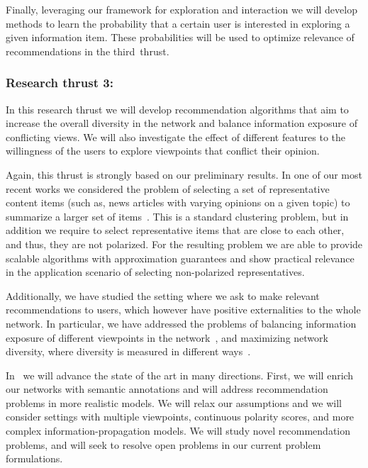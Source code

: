 \documentclass[a4paper,11pt]{article}
\begin{document}
\smallskip
Finally, leveraging our framework for exploration and interaction 
we will develop methods to learn the probability 
that a certain user is interested in exploring a given information item.
These probabilities will be used to optimize relevance of recommendations
in the third~thrust.


\subsubsection*{Research thrust 3: \recommend}

\noindent
\hspace{-3mm}\colorbox{verylightmagenta}{
\begin{minipage}{\textwidth}
In this research thrust we will 
develop recommendation algorithms that aim to increase the overall diversity in the network and 
balance information exposure of conflicting views. 
We will also investigate the effect of different features 
to the willingness of the users to explore viewpoints that conflict their opinion.
\end{minipage}}

\medskip
Again, this thrust is strongly based on our preliminary results.
In one of our most recent works we considered the problem of 
selecting a set of representative content items
(such as, news articles with varying opinions on a given topic)
to summarize a larger set of items~\cite{consensus-k-median}. 
This is a standard clustering problem, 
but in addition we require to select representative items
that are close to each other,
and thus, they are not polarized.
For the resulting problem we are able to provide scalable
algorithms with approximation guarantees
and show practical relevance in the application scenario
of selecting non-polarized representatives.

\smallskip
Additionally, we have studied the setting where
we ask to make relevant recommendations to users, 
which however have positive externalities to the whole network.
In particular,
we have addressed the problems
of balancing information exposure of different viewpoints in the network~\cite{garimella2017balancing},
and maximizing network diversity, 
where diversity is measured in different ways~\cite{diversity-cascade,diversity-static}.

\smallskip
In \acronym\ we will advance the state of the art in many directions.
First, we will enrich our networks with semantic annotations 
and will address recommendation problems in more realistic models. 
We will relax our assumptions and we will consider settings with multiple viewpoints, 
continuous polarity scores, 
and more complex information-propagation models.
We will study novel recommendation problems, 
and will seek to resolve open problems in our current problem formulations.
\end{document}
